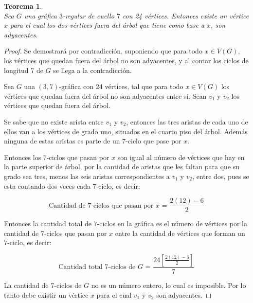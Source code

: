 \documentclass[12pt]{book}
\newtheorem{theorem}{Teorema}
\theoremstyle{definition}
\begin{document}
\begin{figure}
  \centering
  \caption{} \label{arbol(3,7)mas2}
\end{figure}



\begin{theorem}\textbf{}\\\label{teoexistex}
Sea $G$ una gráfica $3$-regular de cuello $7$ con 24
vértices. Entonces existe un vértice $x$ para el cual los dos vértices
fuera del árbol que tiene como base a $x$, son adyacentes.
\end{theorem}


\begin{proof}
Se demostrará por contradicción, suponiendo que para todo $x\in V(G)$,
los vértices que quedan fuera del árbol no son adyacentes, y al contar
los ciclos de longitud 7 de $G$ se llega a la contradicción.  


Sea $G$ una $(3,7)$-gráfica con 24 vértices, tal que para todo $x\in V(G)$ los
vértices que quedan fuera del árbol no son adyacentes entre sí. Sean
$v_1$ y $v_2$ los vértices que quedan fuera del árbol.

Se sabe que no existe arista entre $v_1$
y $v_2$, entonces las tres aristas de cada uno de ellos van a los
vértices de grado uno, situados en el cuarto piso del árbol. Además
ninguna de estas aristas es parte de un
$7$-ciclo que pase por $x$.

Entonces los $7$-ciclos que pasan por $x$
son igual al número de vértices que hay en la parte superior de árbol,
por la cantidad de aristas que les faltan para que su grado sea tres, menos
las seis aristas correspondientes a $v_1$ y $v_2$, entre dos, pues se
esta contando dos veces cada $7$-ciclo, es decir:

\begin{equation*}
  \text{Cantidad de $7$-ciclos que pasan por $x$ = } \frac{2(12)-6}{2}
\end{equation*}


Entonces la cantidad total de $7$-ciclos en la gráfica es el número de
vértices por la cantidad de $7$-ciclos que pasan por $x$ entre la
cantidad de vértices que forman un $7$-ciclo, es decir:

\begin{equation*}
\text{Cantidad total 7-ciclos de $G$ = }\frac{24[\frac{2(12)-6}{2}]}{7} 
\end{equation*}

La cantidad de 7-ciclos de $G$ no es un número entero, lo cual es
imposible. Por lo tanto debe existir un vértice $x$ para el cual $v_1$
y $v_2$ son adyacentes.
\end{proof}
\end{document}
